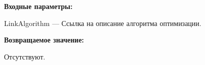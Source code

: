 \textbf{Входные параметры:}

LinkAlgorithm --- Ссылка на описание алгоритма оптимизации.

\textbf{Возвращаемое значение:}

Отсутствуют.